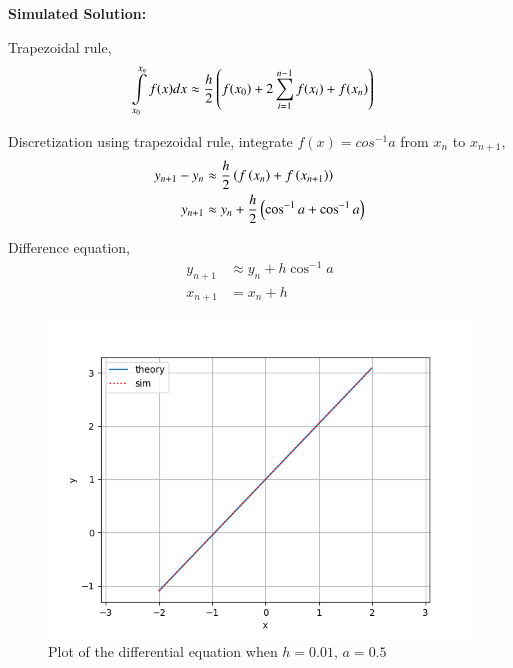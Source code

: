 \documentclass[journal]{IEEEtran}
\begin{document}
\medskip

\textbf{Simulated Solution:}

Trapezoidal rule,
\begin{align}
    \int\limits_{x_0}^{x_n}f(x)dx &\approx \frac{h}{2} \left(f(x_{0}) + 2 \sum_{i=1}^{n-1} f(x_{i}) + f(x_{n}) \right)
\end{align}

Discretization using trapezoidal rule, integrate $f(x)=cos^{-1}a$ from $x_{n}$ to $x_{n+1}$,
\begin{align}
    y_{n+1}-y_{n} &\approx \frac{h}{2}\left(f\left(x_{n}\right)+f\left(x_{n+1}\right)\right) \\
    y_{n+1} &\approx y_{n} + \frac{h}{2}\left(\cos^{-1}a + \cos^{-1}a\right)
\end{align}

Difference equation,
\begin{align}
    y_{n+1} &\approx y_{n} + h\cos^{-1}a \\
    x_{n+1} &= x_n + h
\end{align}

\begin{figure}[h]
    \centering
    \includegraphics[width=\columnwidth]{figs/plot.png}
    \caption{Plot of the differential equation when $h=0.01$, $a=0.5$}
    \label{fig:Plot1}
    \end{figure}
\end{document}
